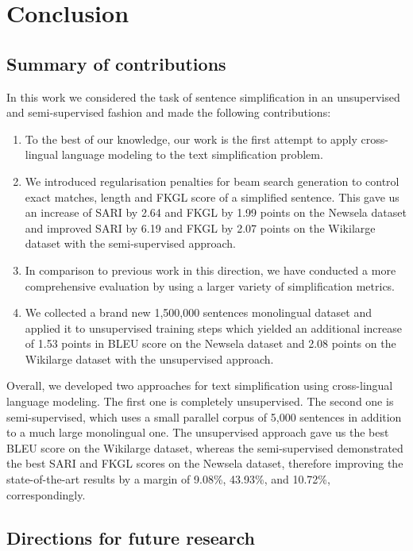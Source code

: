 \chapter{Conclusion}
\label{chap:conclusion}

\section{Summary of contributions}

In this work we considered the task of sentence simplification in an unsupervised and semi-supervised fashion and made the following contributions:

\begin{enumerate}
    \item To the best of our knowledge, our work is the first attempt to apply cross-lingual language modeling to the text simplification problem.
    \item We introduced regularisation penalties for beam search generation to control exact matches, length and FKGL score of a simplified sentence. This gave us an increase of SARI by 2.64 and FKGL by 1.99 points on the Newsela dataset and improved SARI by 6.19 and FKGL by 2.07 points on the Wikilarge dataset with the semi-supervised approach.
    \item In comparison to previous work in this direction, we have conducted a more comprehensive evaluation by using a larger variety of simplification metrics.
    \item We collected a brand new 1,500,000 sentences monolingual dataset and applied it to unsupervised training steps which yielded an additional increase of 1.53 points in BLEU score on the Newsela dataset and 2.08 points on the Wikilarge dataset with the unsupervised approach. 
\end{enumerate}

Overall, we developed two approaches for text simplification using cross-lingual language modeling. The first one is completely unsupervised. The second one is semi-supervised, which uses a small parallel corpus of 5,000 sentences in addition to a much large monolingual one. The unsupervised approach gave us the best BLEU score on the Wikilarge dataset, whereas the semi-supervised demonstrated the best SARI and FKGL scores on the Newsela dataset, therefore improving the state-of-the-art results by a margin of 9.08\%, 43.93\%, and 10.72\%, correspondingly. 


\section{Directions for future research}

